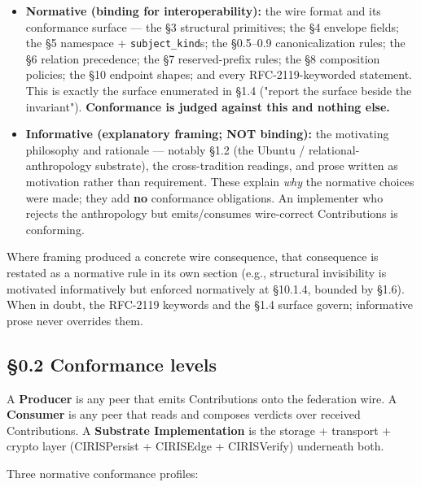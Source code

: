 \documentclass[11pt]{article}
\begin{document}
\begin{itemize}\setlength\itemsep{0pt}
\item \textbf{Normative (binding for interoperability):} the wire format and its conformance surface — the §3 structural primitives; the §4 envelope fields; the §5 namespace + \texttt{subject\_kind}s; the §0.5–0.9 canonicalization rules; the §6 relation precedence; the §7 reserved-prefix rules; the §8 composition policies; the §10 endpoint shapes; and every RFC-2119-keyworded statement. This is exactly the surface enumerated in §1.4 ("report the surface beside the invariant"). \textbf{Conformance is judged against this and nothing else.}
\item \textbf{Informative (explanatory framing; NOT binding):} the motivating philosophy and rationale — notably §1.2 (the Ubuntu / relational-anthropology substrate), the cross-tradition readings, and prose written as motivation rather than requirement. These explain \textit{why} the normative choices were made; they add \textbf{no} conformance obligations. An implementer who rejects the anthropology but emits/consumes wire-correct Contributions is conforming.
\end{itemize}


Where framing produced a concrete wire consequence, that consequence is restated as a normative rule in its own section (e.g., structural invisibility is motivated informatively but enforced normatively at §10.1.4, bounded by §1.6). When in doubt, the RFC-2119 keywords and the §1.4 surface govern; informative prose never overrides them.



\subsection*{§0.2 Conformance levels}


A \textbf{Producer} is any peer that emits Contributions onto the federation wire. A \textbf{Consumer} is any peer that reads and composes verdicts over received Contributions. A \textbf{Substrate Implementation} is the storage + transport + crypto layer (CIRISPersist + CIRISEdge + CIRISVerify) underneath both.


Three normative conformance profiles:
\end{document}
